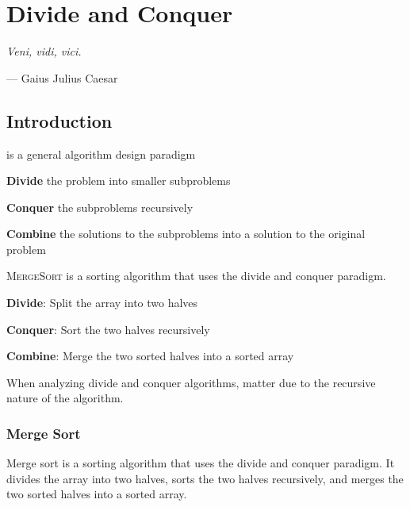 \chapter{Divide and Conquer}

\textit{Veni, vidi, vici.} 
\begin{flushright}
    --- Gaius Julius Caesar
\end{flushright}

\section{Introduction}

 is a general algorithm design paradigm

\begin{listu}
    \item \textbf{Divide} the problem into smaller subproblems
    \item \textbf{Conquer} the subproblems recursively
    \item \textbf{Combine} the solutions to the subproblems into a solution to the original problem
\end{listu}

\begin{example}
    \textsc{MergeSort} is a sorting algorithm that uses the divide and conquer paradigm.

    \begin{listu}
        \item \textbf{Divide}: Split the array into two halves
        \item \textbf{Conquer}: Sort the two halves recursively
        \item \textbf{Combine}: Merge the two sorted halves into a sorted array
    \end{listu}
\end{example}

\begin{remark}
    When analyzing divide and conquer algorithms,  matter due to the recursive nature of the algorithm.
\end{remark}

\subsection{Merge Sort}

Merge sort is a sorting algorithm that uses the divide and conquer paradigm. It divides the array into two halves, sorts the two halves recursively, and merges the two sorted halves into a sorted array.

